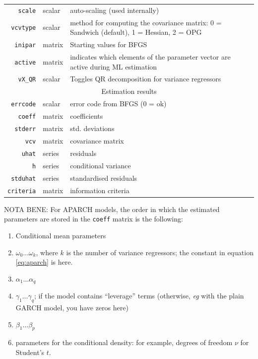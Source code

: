 \documentclass[a4paper,11pt]{article}
\begin{document}
\begin{footnotesize}
\begin{tabular}{rlp{}}
  \hline
  \texttt{scale} & scalar & auto-scaling (used internally) \\
  \texttt{vcvtype} & scalar & method for computing the covariance
  matrix: 0 = Sandwich (default), 1 = Hessian, 2 = OPG\\
  \texttt{inipar} & matrix  & Starting values for BFGS \\
  \texttt{active} & matrix  & indicates which elements of the parameter
  vector are active during ML estimation\\
  \texttt{vX\_QR} & scalar  & Toggles QR decomposition for variance regressors\\
  \hline
  \multicolumn{3}{c}{Estimation results} \\
  \hline
  \texttt{errcode} & scalar & error code from BFGS (0 = ok)\\
  \texttt{coeff} & matrix & coefficients \\
  \texttt{stderr} & matrix & std. deviations \\
  \texttt{vcv} & matrix & covariance matrix \\
  \texttt{uhat} & series & residuals \\
  \texttt{h} & series & conditional variance \\
  \texttt{stduhat} & series & standardised residuals \\
  \texttt{criteria} & matrix & information criteria\\
  \hline
  \hline
\end{tabular}
\end{footnotesize}

\clearpage

NOTA BENE: For APARCH models, the order in which the estimated
parameters are stored in the \texttt{coeff} matrix is the following: 
\begin{enumerate}
\item Conditional mean parameters
\item $\omega_0 \ldots \omega_k$, where $k$ is the number of variance
  regressors; the constant in equation \eqref{eq:aparch} is here.
\item $\alpha_1 \ldots \alpha_q$
\item $\gamma_1 \ldots \gamma_q$; if the model contains ``leverage''
  terms (otherwise, \emph{eg} with the plain GARCH model, you have
  zeros here)
\item $\beta_1 \ldots \beta_p$
\item parameters for the conditional density: for example, degrees of
  freedom $\nu$ for Student's $t$.
\end{enumerate}
\end{document}
